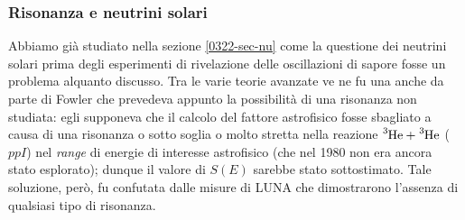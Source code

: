 \subsubsection{Risonanza e neutrini solari}\label{0325-sec-risnu}
Abbiamo già studiato nella sezione \ref{0322-sec-nu}  come la questione dei neutrini solari prima degli esperimenti di rivelazione delle oscillazioni di sapore fosse un problema alquanto discusso.%
Tra le varie teorie avanzate ve ne fu una anche da parte di Fowler che prevedeva appunto la possibilità di una risonanza non studiata: egli supponeva che il calcolo del fattore astrofisico fosse sbagliato a causa di una risonanza o sotto soglia o molto stretta nella reazione $\ce{^3He}+\ce{^3He}$ ($ppI$) nel \textit{range} di energie di interesse astrofisico (che nel 1980 non era ancora stato esplorato); dunque il valore di $S(E)$ sarebbe stato sottostimato. Tale soluzione, però, fu confutata dalle misure di LUNA che dimostrarono l'assenza di qualsiasi tipo di risonanza.